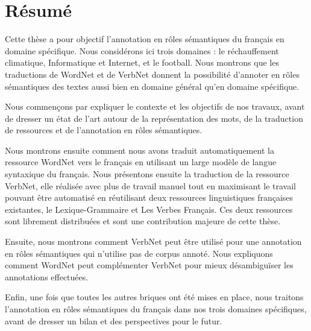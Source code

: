 \documentclass[oneside,parskip,draft]{scrbook}
\date{\Large
    \begin{minipage}[t]{0.6\linewidth}
    \begin{center}\textbf{Thèse sous la direction de :}\end{center}
    \begin{center}Laurence \textsc{Danlos} et Gaël \textsc{de Chalendar}\end{center}
    \end{minipage}
    \vspace{1em}
}
\title{}
\begin{document}
\maketitle

\frontmatter



\chapter{Résumé}


Cette thèse a pour objectif l'annotation en rôles sémantiques du français en
domaine spécifique. Nous considérons ici trois domaines : le réchauffement
climatique, Informatique et Internet, et le football. Nous montrons que les
traductions de WordNet et de VerbNet donnent la possibilité d'annoter en rôles
sémantiques des textes aussi bien en domaine général qu'en domaine spécifique.

Nous commençons par expliquer le contexte et les objectifs de nos travaux,
avant de dresser un état de l'art autour de la représentation des mots, de la
traduction de ressources et de l'annotation en rôles sémantiques.

Nous montrons ensuite comment nous avons traduit automatiquement la ressource
WordNet vers le français en utilisant un large modèle de langue syntaxique du
français. Nous présentons ensuite la traduction de la ressource VerbNet, elle
réalisée avec plus de travail manuel tout en maximisant le travail pouvant être
automatisé en réutilisant deux ressources linguistiques françaises existantes,
le Lexique-Grammaire et Les Verbes Français. Ces deux ressources sont librement
distribuées et sont une contribution majeure de cette thèse.

Ensuite, nous montrons comment VerbNet peut être utilisé pour une annotation en
rôles sémantiques qui n'utilise pas de corpus annoté. Nous expliquons comment
WordNet peut complémenter VerbNet pour mieux désambiguïser les annotations
effectuées.

Enfin, une fois que toutes les autres briques ont été mises en place, nous
traitons l'annotation en rôles sémantiques du français dans nos trois domaines
spécifiques, avant de dresser un bilan et des perspectives pour le futur.
\end{document}
